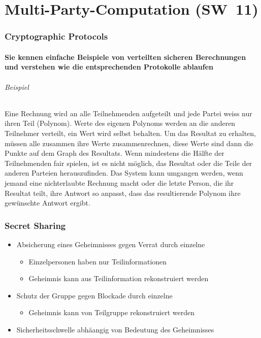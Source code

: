 \documentclass[10pt,a4paper]{article}
\begin{document}
\part{Multi-Party-Computation (SW~11)}
\section{Cryptographic Protocols}
\subsection*{Sie kennen einfache Beispiele von verteilten sicheren Berechnungen und verstehen wie die entsprechenden Protokolle ablaufen}
\paragraph*{Beispiel}Eine Rechnung wird an alle Teilnehmenden aufgeteilt und jede Partei weiss nur ihren Teil (Polynom). Werte des eigenen Polynoms werden an die anderen Teilnehmer verteilt, ein Wert wird selbst behalten. Um das Resultat zu erhalten, müssen alle zusammen ihre Werte zusammenrechnen, diese Werte sind dann die Punkte auf dem Graph des Resultats.
Wenn mindestens die Hälfte der Teilnehmenden fair spielen, ist es nicht möglich, das Resultat oder die Teile der anderen Parteien herauszufinden. Das System kann umgangen werden, wenn jemand eine nichterlaubte Rechnung macht oder die letzte Person, die ihr Resultat teilt, ihre Antwort so anpasst, dass das resultierende Polynom ihre gewünschte Antwort ergibt.


\section{Secret Sharing}
\begin{itemize}[noitemsep,topsep=0pt,leftmargin=*]
    \item Absicherung eines Geheimnisses gegen Verrat durch einzelne
    \begin{itemize}[noitemsep,topsep=0pt,leftmargin=*]
        \item Einzelpersonen haben nur Teilinformationen
        \item Geheimnis kann aus Teilinformation rekonstruiert werden
    \end{itemize}
    \item Schutz der Gruppe gegen Blockade durch einzelne
    \begin{itemize}[noitemsep,topsep=0pt,leftmargin=*]
        \item Geheimnis kann von Teilgruppe rekonstruiert werden
    \end{itemize}
    \item Sicherheitsschwelle abhäangig von Bedeutung des Geheimnisses
\end{itemize}
\end{document}

